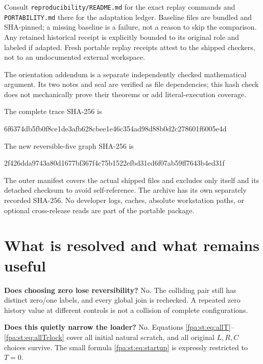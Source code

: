\documentclass[11pt,a4paper]{article}
\numberwithin{equation}{section}
\newcommand{\code}[1]{\texttt{\small #1}}
\begin{document}
Consult \code{reproducibility/README.md} for the exact replay commands and
\code{PORTABILITY.md} there for the adaptation ledger. Baseline files are
bundled and SHA-pinned; a missing baseline is a failure, not a reason to skip
the comparison. Any retained historical receipt is explicitly bounded to
its original role and labeled if adapted. Fresh portable replay receipts
attest to the shipped checkers, not to an undocumented external workspace.

The orientation addendum is a separate independently checked mathematical
argument. Its two notes and seal are verified as file dependencies; this hash
check does not mechanically prove their theorems or add literal-execution
coverage.

\begin{samepage}
The complete trace SHA-256 is
\begin{center}\small\ttfamily
6f6374db5fb0f8ce1de3afb628cbee1e46c354ad98d88b0d2c278601f6005e4d
\end{center}
\end{samepage}
\begin{samepage}
The new reversible-five graph SHA-256 is
\begin{center}\small\ttfamily
2f426dda9743a80d1677bf367f4c75b1522efbd31cd6f07ab59ff7643b4ed31f
\end{center}
\end{samepage}
The outer manifest covers the actual shipped files and excludes only itself
and its detached checksum to avoid self-reference. The archive has its own
separately recorded SHA-256. No developer logs, caches, absolute workstation
paths, or optional cross-release reads are part of the portable package.

\section{What is resolved and what remains useful}\label{fpa:rep:17:last}
\label{fpa:st:sec:questions}
\textbf{Does choosing zero lose reversibility?} No. The colliding pair still
has distinct zero/one labels, and every global join is rechecked. A repeated
zero history value at different controls is not a collision of complete
configurations.

\textbf{Does this quietly narrow the loader?} No. Equations
\eqref{fpa:st:eq:allT}--\eqref{fpa:st:eq:allTclock} cover all initial natural scratch, and
all original $L,R,C$ choices survive. The small formula
\eqref{fpa:st:eq:startup} is expressly restricted to $T=0$.
\end{document}
